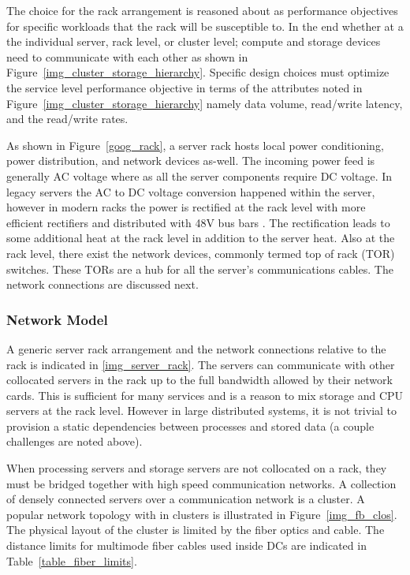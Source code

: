             The choice for the rack arrangement is reasoned about as performance objectives for specific workloads that the rack will be susceptible to. In the end whether at a the individual server, rack level, or cluster level; compute and storage devices need to communicate with each other as shown in Figure~\ref{img_cluster_storage_hierarchy}. Specific design choices must optimize the service level performance objective in terms of the attributes noted in Figure~\ref{img_cluster_storage_hierarchy} namely data volume, read/write latency, and the read/write rates.
            
            
            
            As shown in Figure~\ref{goog_rack}, a server rack hosts local power conditioning, power distribution, and network devices as-well. The incoming power feed is generally AC voltage where as all the server components require DC voltage. In legacy servers the AC to DC voltage conversion happened within the server, however in modern racks the power is rectified at the rack level with more efficient rectifiers and distributed with 48V bus bars \cite{open_compute_48V}. The rectification leads to some additional heat at the rack level in addition to the server heat. Also at the rack level, there exist the network devices, commonly termed top of rack (TOR) switches. These TORs are a hub for all the server's communications cables. The network connections are discussed next. 
    
        \subsubsection{Network Model}
        \label{Network}
        A generic server rack arrangement and the network connections relative to the rack is indicated in \ref{img_server_rack}. The servers can communicate with other collocated servers in the rack up to the full bandwidth allowed by their network cards. This is sufficient for many services and is a reason to mix storage and CPU servers at the rack level. However in large distributed systems, it is not trivial to provision a static dependencies between processes and stored data (a couple challenges are noted above). 
    
        
        
        When processing servers and storage servers are not collocated on a rack, they must be bridged together with high speed communication networks. A collection of densely connected servers over a communication network is a cluster. A popular network topology with in clusters is illustrated in Figure~\ref{img_fb_clos}. The physical layout of the cluster is limited by the fiber optics and cable. The distance limits for multimode fiber cables used inside DCs are indicated in Table~\ref{table_fiber_limits}.
        
